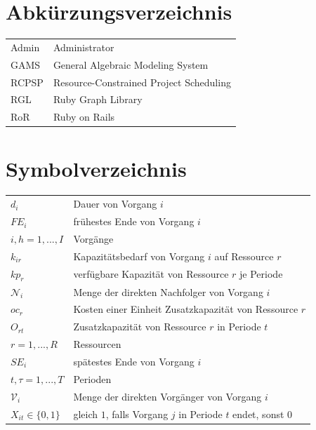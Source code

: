 \documentclass[a4paper,12pt,parskip,bibtotoc,liststotoc]{article}
\begin{document}
\section*{Abkürzungsverzeichnis}
\begin{table}[h!]
    \vspace*{-3mm}
    \hspace*{2mm}
  \renewcommand{\arraystretch}{1,5}
    \begin{tabular}{ll}  %
	Admin & Administrator \\         
	GAMS & General Algebraic Modeling System\\
	RCPSP      & Resource-Constrained Project Scheduling \\
	RGL & Ruby Graph Library\\
           RoR & Ruby on Rails \\
	\end{tabular}
\end{table}

\newpage
\renewcommand\lstlistlistingname{Quellcodeverzeichnis} 
\lstlistoflistings 
\renewcommand*\lstlistingname{Quellcode} 

\newpage

\newpage
\section*{Symbolverzeichnis}
\begin{table}[h!]
    \vspace*{-3mm}
        \hspace*{2mm}
      \renewcommand{\arraystretch}{1,5}
    \begin{tabular}{ll} 
$d_i$ & Dauer von Vorgang $i$ \\
$FE_i$& frühestes Ende von Vorgang $i$\\
$i,h=1,...,I$ & Vorgänge \\
$k_{ir}$& Kapazitätsbedarf von Vorgang $i$ auf Ressource $r$\\
$kp_r$ & verfügbare Kapazität von Ressource $r$ je Periode\\
$\mathcal{N}_i$ & Menge der direkten Nachfolger von Vorgang $i$ \\
$oc_r$ & Kosten einer Einheit Zusatzkapazität von Ressource $r$ \\
$O_{rt}$ & Zusatzkapazität von Ressource $r$ in Periode $t$ \\
$r=1,...,R$ & Ressourcen \\
$SE_i$& spätestes Ende von Vorgang $i$\\
$t,\tau=1,..., T$ & Perioden\\
$\mathcal{V}_i$ & Menge der direkten Vorgänger von Vorgang $i$ \\
$X_{it}\in\{0,1\}$ & gleich $1$, falls Vorgang $j$ in Periode $t$ endet, sonst $0$
  	\end{tabular}
\end{table}
\newpage
{}   %
\end{document}
